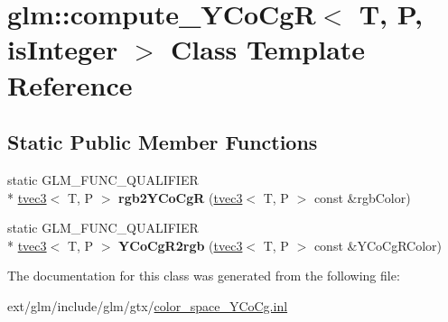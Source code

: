 \hypertarget{classglm_1_1compute___y_co_cg_r}{\section{glm\-:\-:compute\-\_\-\-Y\-Co\-Cg\-R$<$ T, P, is\-Integer $>$ Class Template Reference}
\label{classglm_1_1compute___y_co_cg_r}
}
\subsection*{Static Public Member Functions}
\begin{DoxyCompactItemize}
\item 
\hypertarget{classglm_1_1compute___y_co_cg_r_af5f438f3ec49d12f350e6ed2bb1c896c}{static G\-L\-M\-\_\-\-F\-U\-N\-C\-\_\-\-Q\-U\-A\-L\-I\-F\-I\-E\-R \\*
\hyperlink{structglm_1_1tvec3}{tvec3}$<$ T, P $>$ {\bfseries rgb2\-Y\-Co\-Cg\-R} (\hyperlink{structglm_1_1tvec3}{tvec3}$<$ T, P $>$ const \&rgb\-Color)}\label{classglm_1_1compute___y_co_cg_r_af5f438f3ec49d12f350e6ed2bb1c896c}

\item 
\hypertarget{classglm_1_1compute___y_co_cg_r_a08e033fb9983afcffecc1b20de968715}{static G\-L\-M\-\_\-\-F\-U\-N\-C\-\_\-\-Q\-U\-A\-L\-I\-F\-I\-E\-R \\*
\hyperlink{structglm_1_1tvec3}{tvec3}$<$ T, P $>$ {\bfseries Y\-Co\-Cg\-R2rgb} (\hyperlink{structglm_1_1tvec3}{tvec3}$<$ T, P $>$ const \&Y\-Co\-Cg\-R\-Color)}\label{classglm_1_1compute___y_co_cg_r_a08e033fb9983afcffecc1b20de968715}

\end{DoxyCompactItemize}


The documentation for this class was generated from the following file\-:\begin{DoxyCompactItemize}
\item 
ext/glm/include/glm/gtx/\hyperlink{color__space___y_co_cg_8inl}{color\-\_\-space\-\_\-\-Y\-Co\-Cg.\-inl}\end{DoxyCompactItemize}
